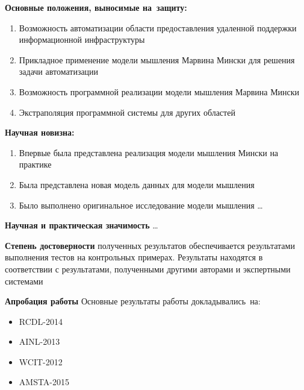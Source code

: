 \textbf{Основные положения, выносимые на~защиту:}
\begin{enumerate}
  \item Возможность автоматизации области предоставления удаленной поддержки информационной инфраструктуры 
  \item Прикладное применение модели мышления Марвина Мински для решения задачи автоматизации
  \item Возможность программной реализации модели мышления Марвина Мински
  \item Экстраполяция программной системы для других областей
\end{enumerate}

\textbf{Научная новизна:}
\begin{enumerate}
  \item Впервые была представлена реализация модели мышления Мински на практике
  \item Была представлена новая модель данных для модели мышления 
  \item Было выполнено оригинальное исследование модели мышления \ldots
\end{enumerate}

\textbf{Научная и практическая значимость} \ldots

\textbf{Степень достоверности} полученных результатов обеспечивается результатами выполнения тестов на контрольных примерах. Результаты находятся в соответствии с результатами, полученными другими авторами и экспертными системами

\textbf{Апробация работы}
Основные результаты работы докладывались~на:
\begin{itemize}
	\item RCDL-2014
	\item AINL-2013
	\item WCIT-2012
	\item AMSTA-2015
\end{itemize}


